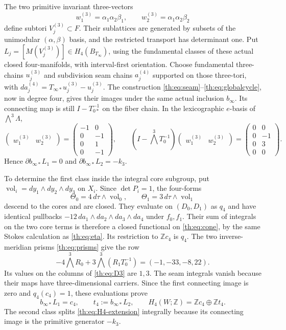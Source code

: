 The two primitive invariant three-vectors
\[
 w_1^{(3)}=\alpha_1\alpha_2\beta_1,\qquad
 w_2^{(3)}=\alpha_1\alpha_2\beta_2
\]
define subtori $V_j^{(3)}\subset F$. Their sublattices are generated by
subsets of the unimodular $(\alpha,\beta)$ basis, and the restricted
transport has determinant one. Put $L_j=[M(V_j^{(3)})]\in H_4(B_{T_\infty})$,
using the fundamental classes of these actual closed four-manifolds,
with interval-first orientation.
Choose fundamental three-chains $u_j^{(3)}$ and subdivision seam chains
$a_j^{(4)}$ supported on those three-tori, with
$da_j^{(4)}=T_{\infty*}u_j^{(3)}-u_j^{(3)}$.
The construction \eqref{th:eq:seam}--\eqref{th:eq:globalcycle}, now in
degree four, gives their images under the same actual inclusion
$b_\infty$. Its connecting map is still $I-T_{0*}^{-1}$ on the fiber
chain. In the lexicographic $e$-basis of $\bigwedge^3\Lambda$,
\begin{equation}\label{th:eq:D3}
 \begin{pmatrix}w_1^{(3)}&w_2^{(3)}\end{pmatrix}
 =\begin{pmatrix}-1&0\\0&-1\\0&1\\0&-1\end{pmatrix},
 \qquad
 (I-\bigwedge^3T_0^{-1})
 \begin{pmatrix}w_1^{(3)}&w_2^{(3)}\end{pmatrix}
 =\begin{pmatrix}0&0\\0&-1\\0&3\\0&0\end{pmatrix}.
\end{equation}
Hence $\partial b_{\infty*}L_1=0$ and
$\partial b_{\infty*}L_2=-k_3$.

To determine the first class inside the integral core subgroup, put
$\operatorname{vol}_i=dy_1\wedge dy_2\wedge dy_3$ on $X_i$.
Since $\det P_i=1$, the four-forms
\[
 \Theta_0=4\,d\tau\wedge\operatorname{vol}_0,\qquad
 \Theta_1=3\,d\tau\wedge\operatorname{vol}_1
\]
descend to the cores and are closed. They evaluate on $(D_0,D_1)$ as
$q_4$ and have identical pullbacks
$-12\,da_1\wedge da_2\wedge da_3\wedge da_4$ under $f_0,f_1$.
Their sum of integrals on the two core terms is therefore a closed
functional on \eqref{th:eq:cone}, by the same Stokes calculation as
\eqref{th:eq:eta}. Its restriction to $\mathbb Zc_4$ is $q_4$.
The two inverse-meridian prisms \eqref{th:eq:prisms} give the row
\begin{equation}\label{th:eq:lambda4}
 -4\bigwedge^3R_0+3\bigwedge^3(R_1T_0^{-1})
       =(-1,-33,-8,22).
\end{equation}
Its values on the columns of \eqref{th:eq:D3} are $1,3$.
The seam integrals vanish because their maps have three-dimensional
carriers. Since the first connecting image is zero and $q_4(c_4)=1$,
these evaluations prove
\[
 b_{\infty*}L_1=c_4,\qquad t_4:=b_{\infty*}L_2,\qquad
 H_4(W;\mathbb Z)=\mathbb Zc_4\oplus\mathbb Zt_4.
\]
The second class splits \eqref{th:eq:H4-extension} integrally because
its connecting image is the primitive generator $-k_3$.

